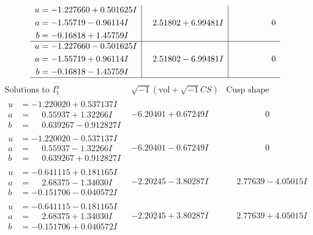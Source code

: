 \documentclass[1p]{elsarticle_modified}
\theoremstyle{definition}
\newcommand{\I}{\sqrt{-1}}
\begin{document}
$$\begin{array}{c|c|c}
\begin{aligned}
u &= -1.227660 + 0.501625 I \\
a &= -1.55719 - 0.96114 I \\
b &= -0.16818 + 1.45759 I\end{aligned}
 & \phantom{-}2.51802 + 6.99481 I & \phantom{-0.000000 } 0 \\ \hline\begin{aligned}
u &= -1.227660 - 0.501625 I \\
a &= -1.55719 + 0.96114 I \\
b &= -0.16818 - 1.45759 I\end{aligned}
 & \phantom{-}2.51802 - 6.99481 I & \phantom{-0.000000 } 0\\
 \hline 
 \end{array}$$\newpage$$\begin{array}{c|c|c}  
\text{Solutions to }I^u_{1}& \I (\text{vol} + \sqrt{-1}CS) & \text{Cusp shape}\\
 \hline 
\begin{aligned}
u &= -1.220020 + 0.537137 I \\
a &= \phantom{-}0.55937 + 1.32266 I \\
b &= \phantom{-}0.639267 - 0.912827 I\end{aligned}
 & -6.20401 + 0.67249 I & \phantom{-0.000000 } 0 \\ \hline\begin{aligned}
u &= -1.220020 - 0.537137 I \\
a &= \phantom{-}0.55937 - 1.32266 I \\
b &= \phantom{-}0.639267 + 0.912827 I\end{aligned}
 & -6.20401 - 0.67249 I & \phantom{-0.000000 } 0 \\ \hline\begin{aligned}
u &= -0.641115 + 0.181165 I \\
a &= \phantom{-}2.68375 - 1.34030 I \\
b &= -0.151706 - 0.040572 I\end{aligned}
 & -2.20245 - 3.80287 I & \phantom{-}2.77639 - 4.05015 I \\ \hline\begin{aligned}
u &= -0.641115 - 0.181165 I \\
a &= \phantom{-}2.68375 + 1.34030 I \\
b &= -0.151706 + 0.040572 I\end{aligned}
 & -2.20245 + 3.80287 I & \phantom{-}2.77639 + 4.05015 I \\ \hline\begin{aligned}

\end{aligned}
\end{array}$$
\end{document}
